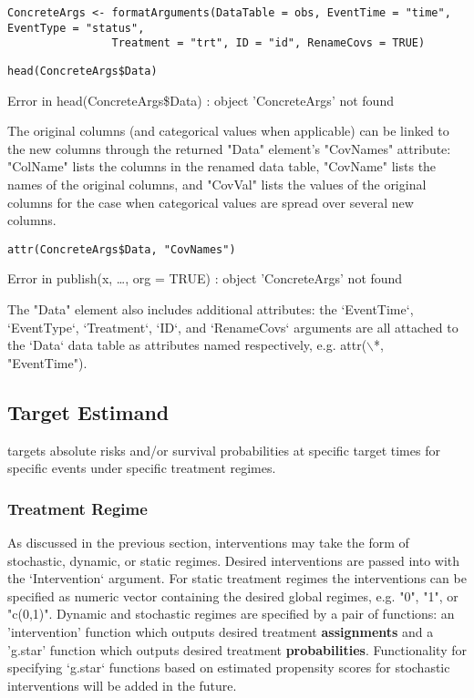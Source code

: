 \documentclass{report}
\newcommand{\1}{\ensuremath{\mathbf{1}}}
\begin{document}
\begin{lstlisting}
ConcreteArgs <- formatArguments(DataTable = obs, EventTime = "time", EventType = "status", 
				Treatment = "trt", ID = "id", RenameCovs = TRUE)
\end{lstlisting}

\begin{lstlisting}
head(ConcreteArgs$Data)
\end{lstlisting}

Error in head(ConcreteArgs\$Data) : object 'ConcreteArgs' not found

The original columns (and categorical values when applicable) can be linked to the new columns through the returned "Data" element's "CovNames" attribute: "ColName" lists the columns in the renamed data table, "CovName" lists the names of the original columns, and "CovVal" lists the values of the original columns for the case when categorical values are spread over several new columns.   

\begin{lstlisting}
attr(ConcreteArgs$Data, "CovNames")
\end{lstlisting}

Error in publish(x, \ldots{}, org = TRUE) : object 'ConcreteArgs' not found

The "Data" element also includes additional attributes: the `EventTime`, `EventType`, `Treatment`, `ID`, and `RenameCovs` arguments are all attached to the `Data` data table as attributes named respectively, e.g. attr($\backslash$*, "EventTime").

\subsection{Target Estimand}
\label{sec:orgb4f495f}
 targets absolute risks and/or survival probabilities at specific target times for specific events under specific treatment regimes. 

\subsubsection{Treatment Regime}
\label{sec:orgce79ee6}
As discussed in the previous section, interventions may take the form of stochastic, dynamic, or static regimes. Desired interventions are passed into  with the `Intervention` argument. For static treatment regimes the interventions can be specified as numeric vector containing the desired global regimes, e.g. "0", "1", or "c(0,1)". Dynamic and stochastic regimes are specified by a pair of functions: an 'intervention' function which outputs desired treatment \textbf{assignments} and a 'g.star' function which outputs desired treatment \textbf{probabilities}. Functionality for specifying `g.star` functions based on estimated propensity scores for stochastic interventions will be added in the future.
\end{document}
